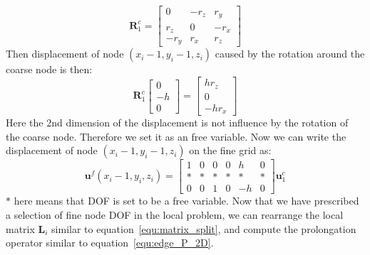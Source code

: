 \begin{equation}
\mathbf{R}^c_1 = \begin{bmatrix} 
0 & -r_z & r_y\\
r_z & 0 & -r_x \\
-r_y & r_x & r_z
\end{bmatrix}
\end{equation}
Then displacement of node $(x_i - 1, y_i - 1, z_i)$ caused by the rotation around the coarse node is then:
\begin{equation}
\mathbf{R}^c_1  \left[\begin{array}{c} 0\\-h\\0\end{array}\right] = \left[\begin{array}{c} hr_z\\0\\-hr_x\end{array}\right]
\end{equation}
Here the $2$nd dimension of the displacement is not influence by the rotation of the coarse node. Therefore we set it as an free variable. Now we can write the displacement of node $(x_i - 1, y_i - 1, z_i)$ on the fine grid as:
 \begin{equation}
 \mathbf{u}^f(x_i - 1, y_i, z_i) = \begin{bmatrix} 
 1 & 0 & 0 & 0 & h & 0\\
 * & * & * & * & * & *\\
 0 & 0 & 1 & 0 & -h & 0 \end{bmatrix} \mathbf{u}^c_1
 \end{equation}
 $*$ here means that DOF is set to be a free variable. Now that we have prescribed a selection of fine node DOF in the local problem, we can rearrange the local matrix $\mathbf{L}_i$ similar to equation~\ref{equ:matrix_split}, and compute the prolongation operator similar to equation~\ref{equ:edge_P_2D}.